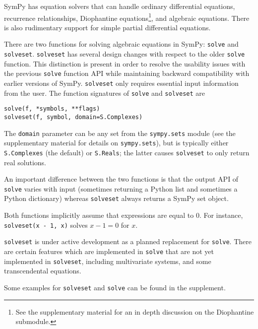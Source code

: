 SymPy has equation solvers that can handle ordinary differential
equations, recurrence relationships, Diophantine equations\footnote{See the
  supplementary material for an in depth discussion on the Diophantine submodule.}, and algebraic
equations. There is also
rudimentary support for simple partial differential equations.

There are two functions for solving algebraic equations in SymPy:
\texttt{solve} and \texttt{solveset}.
\texttt{solveset} has several design changes with respect to the older
\texttt{solve} function. This distinction is present in order to resolve the
usability issues with the
previous \texttt{solve} function API while maintaining backward compatibility
with earlier versions of SymPy.
\texttt{solveset} only requires essential input information from the user.
The function signatures of \texttt{solve} and \texttt{solveset} are
\begin{verbatim}
solve(f, *symbols, **flags)
solveset(f, symbol, domain=S.Complexes)
\end{verbatim}
The \texttt{domain} parameter can be any set from the \texttt{sympy.sets}
module (see the supplementary material for details on \texttt{sympy.sets}),
but is typically either \texttt{S.Complexes} (the
default) or \texttt{S.Reals}; the latter causes \texttt{solveset} to only return real solutions.

An important difference between the two functions is that the output API of \texttt{solve}
varies with input (sometimes returning a Python list and sometimes a Python dictionary) whereas
\texttt{solveset} always returns
a SymPy set object.

Both functions implicitly assume that expressions are equal to 0. For
instance, \texttt{solveset(x - 1, x)} solves $x - 1 = 0$ for $x$.

\texttt{solveset} is under active development as a planned replacement for
\texttt{solve}. There are certain features which are implemented in
\texttt{solve} that are not yet implemented in \texttt{solveset}, including
multivariate systems, and some transcendental equations.

Some examples for \texttt{solveset} and \texttt{solve} can be found in the
supplement.
